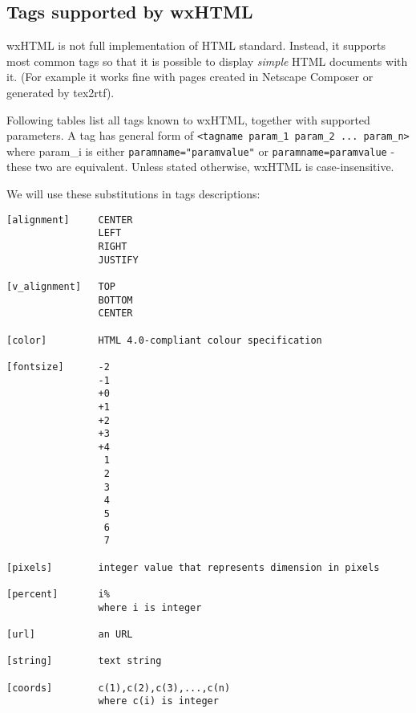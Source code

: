 \subsection{Tags supported by wxHTML}\label{htmltagssupported}

wxHTML is not full implementation of HTML standard. Instead, it supports most common tags so that it 
is possible to display {\it simple} HTML documents with it. (For example it works fine with pages created
in Netscape Composer or generated by tex2rtf).

Following tables list all tags known to wxHTML, together with supported parameters.
A tag has general form of {\tt <tagname param\_1 param\_2 ... param\_n>} where param\_i is
either {\tt paramname="paramvalue"} or {\tt paramname=paramvalue} - these two are equivalent. Unless stated 
otherwise, wxHTML is case-insensitive.


We will use these substitutions in tags descriptions:

\begin{verbatim}
[alignment]     CENTER
                LEFT
                RIGHT
                JUSTIFY

[v_alignment]   TOP
                BOTTOM
                CENTER
                
[color]         HTML 4.0-compliant colour specification

[fontsize]      -2
                -1
                +0
                +1
                +2
                +3
                +4
                 1
                 2
                 3
                 4
                 5
                 6
                 7

[pixels]        integer value that represents dimension in pixels

[percent]       i% 
                where i is integer

[url]           an URL 

[string]        text string

[coords]        c(1),c(2),c(3),...,c(n)
                where c(i) is integer

\end{verbatim}



